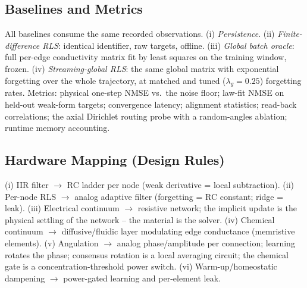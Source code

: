 \documentclass[conference]{IEEEtran}
\begin{document}
\subsection{Baselines and Metrics}
All baselines consume the same recorded observations. (i) \emph{Persistence}.
(ii) \emph{Finite-difference RLS}: identical identifier, raw targets, offline.
(iii) \emph{Global batch oracle}: full per-edge conductivity matrix fit by least
squares on the training window, frozen. (iv) \emph{Streaming-global RLS}: the same
global matrix with exponential forgetting over the whole trajectory, at matched and
tuned ($\lambda_g = 0.25$) forgetting rates. Metrics: physical one-step NMSE vs.\ the
noise floor; law-fit NMSE on held-out weak-form targets; convergence latency;
alignment statistics; read-back correlations; the axial Dirichlet routing probe with a
random-angles ablation; runtime memory accounting.

\subsection{Hardware Mapping (Design Rules)}
(i) IIR filter $\to$ RC ladder per node (weak derivative = local subtraction). (ii)
Per-node RLS $\to$ analog adaptive filter (forgetting = RC constant; ridge = leak).
(iii) Electrical continuum $\to$ resistive network; the implicit update is the physical
settling of the network -- the material is the solver. (iv) Chemical continuum $\to$
diffusive/fluidic layer modulating edge conductance (memristive elements). (v)
Angulation $\to$ analog phase/amplitude per connection; learning rotates the phase;
consensus rotation is a local averaging circuit; the chemical gate is a
concentration-threshold power switch. (vi) Warm-up/homeostatic dampening $\to$
power-gated learning and per-element leak.
\end{document}

